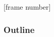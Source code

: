 [frame number]
\AtBeginSection
{
  \begin{frame}
    \frametitle{Outline}
    \tableofcontents[currentsection]
  \end{frame}
}
